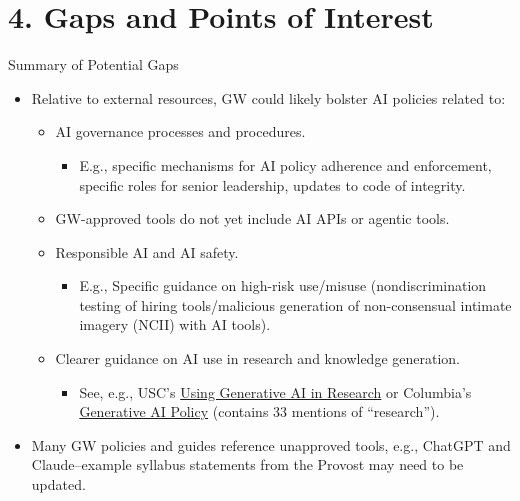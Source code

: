 \documentclass[aspectratio=169]{beamer}
\begin{document}
\section{4. Gaps and Points of Interest}\label{gap_analysis}

\begin{frame}{Summary of Potential Gaps}

    \small

    \begin{itemize}
        \item Relative to external resources, GW could likely bolster AI policies related to:
        \begin{itemize}
            \item AI governance processes and procedures. 
            \begin{itemize}
                \item E.g., specific mechanisms for AI policy adherence and enforcement, specific roles for senior leadership, updates to code of integrity. 
            \end{itemize}
            \item GW-approved tools do not yet include AI APIs or agentic tools. 
            \item Responsible AI and AI safety.
            \begin{itemize}
                \item E.g., Specific guidance on high-risk use/misuse (nondiscrimination testing of hiring tools/malicious generation of non-consensual intimate imagery (NCII) with AI tools).
            \end{itemize}
            \item Clearer guidance on AI use in research and knowledge generation. 
                \begin{itemize} 
                \item See, e.g., USC's \href{https://libguides.usc.edu/generative-AI/home}{Using Generative AI in Research} or Columbia's \href{https://provost.columbia.edu/content/office-senior-vice-provost/ai-policy}{Generative AI Policy} (contains 33 mentions of ``research'').
            \end{itemize}  
        \end{itemize}
        \item Many GW policies and guides reference unapproved tools, e.g., ChatGPT and Claude--example syllabus statements from the Provost may need to be updated.
    \end{itemize}

\end{frame}
\end{document}
